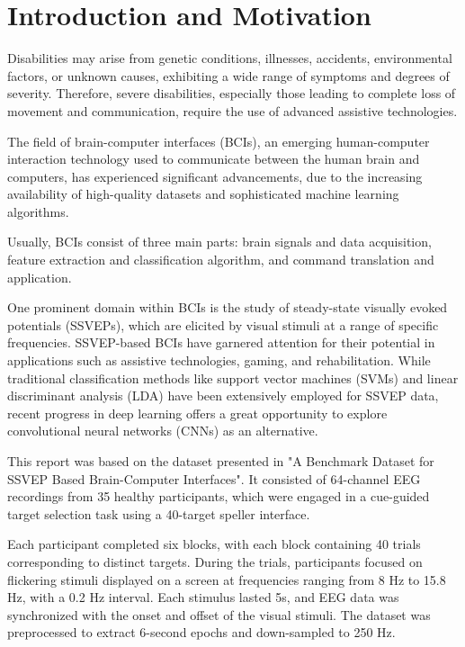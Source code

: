 \section{Introduction and Motivation}

Disabilities may arise from genetic conditions, illnesses, accidents, environmental factors, or unknown causes, exhibiting a wide range of symptoms and degrees of severity. Therefore, severe disabilities, especially those leading to complete loss of movement and communication, require the use of advanced assistive technologies. \cite{siribunyaphat2022steady}

The field of brain-computer interfaces (BCIs), an emerging human-computer interaction technology used to communicate between the human brain and computers, has experienced significant advancements, due to the increasing availability of high-quality datasets and sophisticated machine learning algorithms. \cite{nicolas2012brain}

Usually, BCIs consist of three main parts: brain signals and data acquisition, feature extraction and classification algorithm, and command translation and application. \cite{siribunyaphat2022steady}

 One prominent domain within BCIs is the study of steady-state visually evoked potentials (SSVEPs), which are elicited by visual stimuli at a range of specific frequencies. SSVEP-based BCIs have garnered attention for their potential in applications such as assistive technologies, gaming, and rehabilitation. While traditional classification methods like support vector machines (SVMs) and linear discriminant analysis (LDA) have been extensively employed for SSVEP data, recent progress in deep learning offers a great opportunity to explore convolutional neural networks (CNNs) as an alternative.
 
This report was  based on the dataset presented in "A Benchmark Dataset for SSVEP Based Brain-Computer Interfaces"\cite{wang2017benchmark}. It consisted of 64-channel EEG recordings from 35 healthy participants, which were engaged in a cue-guided target selection task using a 40-target speller interface.

Each participant completed six blocks, with each block containing 40 trials corresponding to distinct targets. During the trials, participants focused on flickering stimuli displayed on a screen at frequencies ranging from 8 Hz to 15.8 Hz, with a 0.2 Hz interval. Each stimulus lasted 5s, and EEG data was synchronized with the onset and offset of the visual stimuli. The dataset was preprocessed to extract 6-second epochs and down-sampled to 250 Hz. 

